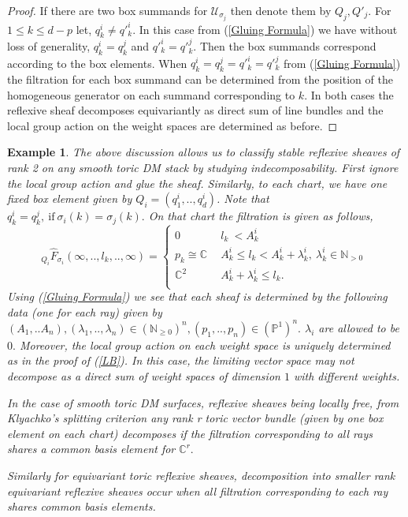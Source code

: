 \documentclass[10pt]{amsart}
\newtheorem{example}{Example}
\numberwithin{equation}{subsection}
\begin{document}
\begin{proof}
If there are two box summands for $\mathscr{U}_{\sigma_j}$ then denote them by $Q_j,Q'_{j}.$ For $1\leq k \leq d-p$ let, $q^i_k\neq q'^i_k.$ In this case from (\ref{Gluing Formula}) we have without loss of generality, $q^i_k=q^j_k$ and $q'^i_k=q'^j_k.$ Then the box summands correspond according to the box elements. When $q^i_k=q^j_k=q'^i_k=q'^j_k$ from (\ref{Gluing Formula}) the filtration for each box summand can be determined from the position of the homogeneous generator on each summand corresponding to $k.$ In both cases the reflexive sheaf decomposes equivariantly as direct sum of line bundles and the local group action on the weight spaces are determined as before. 
\end{proof}
\begin{example}
The above discussion allows us to classify stable reflexive sheaves of rank 2 on any smooth toric DM stack by studying indecomposability. First ignore the local group action and glue the sheaf. Similarly, to each chart, we have one fixed box element given by $Q_i=(q^i_1,..,q^i_d)$. Note that $q^i_k=q^j_k,\ \text{if}\  \sigma_i(k)=\sigma_j(k).$  On that chart the filtration is given as follows,
$$_{Q_i}\hat{F}_{\sigma_i}(\infty,..,l_k,..,\infty)=\left\{ 
\begin{array}{ll}
0 & \ \ l_k\ < A^i_k \ \\[2ex]
p_k \cong \mathbb{C} & \ \ A^i_k \leq l_k < A^i_k+\lambda^i_k,\  \lambda^i_k \in \mathbb{N}_{>0}\ \\[2ex]
\mathbb{C}^2 & \ \   A^i_k+\lambda^i_k\leq l_k.\ \\
\end{array}
\right.$$ 
Using (\ref{Gluing Formula}) we see that each sheaf is determined by the following data (one for each ray) given by $(A_1,..A_n),(\lambda_1,..,\lambda_n)\in (\mathbb{N}_{\geq 0})^n,(p_1,..,p_n)\in (\mathbb{P}^1)^n.$ $\lambda_i$ are allowed to be $0.$ Moreover, the local group action on each weight space is uniquely determined as in the proof of 
(\ref{LB}). In this case, the limiting vector space may not decompose as a direct sum of weight spaces of dimension $1$ with different weights.\par
In the case of smooth toric DM surfaces, reflexive sheaves being locally free, from Klyachko's splitting criterion any rank r toric vector bundle (given by one box element on each chart) decomposes if the filtration corresponding to all rays shares a common basis element for $\mathbb{C}^r.$\par 
Similarly for equivariant toric reflexive sheaves, decomposition into smaller rank equivariant reflexive sheaves occur when all filtration corresponding to each ray shares common basis elements. %

\end{example}
\end{document}
